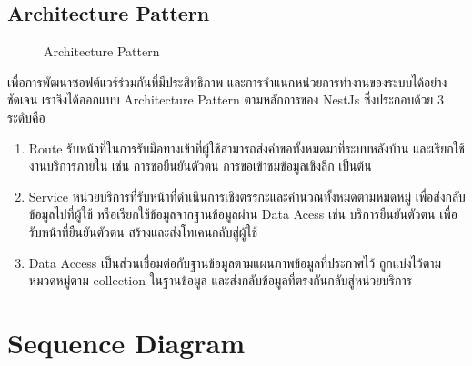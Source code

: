 \subsection{Architecture Pattern}
\begin{figure}[H]\centering
    \setlength{\fboxrule}{0.2mm} %
    \setlength{\fboxsep}{0.5cm}
    \caption{Architecture Pattern}\label{fig:arch_pattern}
\end{figure}
เพื่อการพัฒนาซอฟต์แวร์ร่วมกันที่มีประสิทธิภาพ และการจำแนกหน่วยการทำงานของระบบได้อย่างชัดเจน เราจึงได้ออกแบบ Architecture Pattern ตามหลักการของ NestJs ซึ่งประกอบด้วย 3 ระดับคือ

\begin{enumerate}
    \item Route รับหน้าที่ในการรับมือทางเข้าที่ผู้ใช้สามารถส่งคำขอทั้งหมดมาที่ระบบหลังบ้าน และเรียกใช้งานบริการภายใน เช่น การขอยืนยันตัวตน การขอเข้าชมข้อมูลเชิงลึก เป็นต้น
    \item Service หน่วยบริการที่รับหน้าที่ดำเนินการเชิงตรรกะและคำนวณทั้งหมดตามหมดหมู่ เพื่อส่งกลับข้อมูลไปที่ผู้ใช้ หรือเรียกใช้ข้อมูลจากฐานข้อมูลผ่าน Data Acess เช่น บริการยืนยันตัวตน เพื่อรับหน้าที่ยืนยันตัวตน สร้างและส่งโทเคนกลับสู่ผู้ใช้
    \item Data Access เป็นส่วนเชื่อมต่อกับฐานข้อมูลตามแผนภาพข้อมูลที่ประกาศไว้ ถูกแบ่งไว้ตามหมวดหมู่ตาม collection ในฐานข้อมูล และส่งกลับข้อมูลที่ตรงกันกลับสู่หน่วยบริการ
\end{enumerate}



\section{Sequence Diagram}
